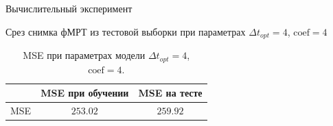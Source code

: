 \documentclass[9pt,pdf]{beamer} %
\begin{document}
\begin{frame}{Вычислительный эксперимент}
\begin{block}{Срез снимка фМРТ из тестовой выборки при параметрах ${\Delta t}_{opt} = 4$, $\mathrm{coef} = 4$}
\begin{figure}[h!]
    \centering
    \hfill
    \hfill
  
    \label{fig:3}
\end{figure}
\end{block}


\begin{table}[h!]
		\centering
		\begin{tabular}{|c|c|c|}
			\hline
				&	MSE при обучении	&	MSE на тесте \\ \hline \hline
			MSE		& 	$253.02$	 &		$259.92$ \\ \hline
		\end{tabular}
		\caption{MSE при параметрах модели ${\Delta t}_{opt} = 4$, $\mathrm{coef} = 4$.}
		\label{table_1}
	\end{table}


\end{frame}
\end{document}
